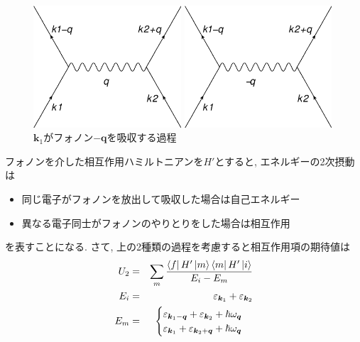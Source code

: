 \documentclass[10.5pt,a4paper]{jreport}
\makeatletter
\newcommand{\figcaption}[1]{\def\@captype{figure}\caption{#1}} %
\makeatother
\begin{document}
\begin{figure}[htbp]
  \begin{minipage}{0.5\hsize}
    \centering
    \includegraphics[width = 5.5cm]{./newdiagram1.eps}
    \figcaption{$\bm{k}_1$がフォノン$\bm{q}$を放出する過程}
    \label{diagram1}
  \end{minipage}
  \begin{minipage}{0.5\hsize}
    \centering
    \includegraphics[width = 5.5cm]{./newdiagram2.eps}
    \figcaption{$\bm{k}_1$がフォノン$\bm{-q}$を吸収する過程}
    \label{diagram2}
  \end{minipage}
\end{figure}
フォノンを介した相互作用ハミルトニアンを$H'$とすると, エネルギーの2次摂動は
\begin{itemize}
\item 同じ電子がフォノンを放出して吸収した場合は自己エネルギー
\item 異なる電子同士がフォノンのやりとりをした場合は相互作用
\end{itemize}
を表すことになる. さて, 上の2種類の過程を考慮すると相互作用項の期待値は
\begin{eqnarray}
  U_2 &=& \sum_m\frac{\bra{f}H'\ket{m}\bra{m}H'\ket{i}}{E_i-E_m}\\
  E_i &=& \varepsilon_{\bm{k}_1} +\varepsilon_{\bm{k}_2}\\
  E_m &=&
  \begin{cases}
    \varepsilon_{\bm{k}_1 - \bm{q}} +\varepsilon_{\bm{k}_2} + \hbar\omega_{\bm{q}}\\
    \varepsilon_{\bm{k}_1} +\varepsilon_{\bm{k}_2 + \bm{q}} + \hbar\omega_{\bm{q}}
  \end{cases}
\end{eqnarray}
\end{document}

